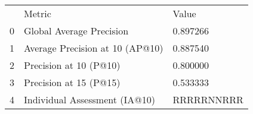 \begin{tabular}{lll}
 & Metric & Value \\
0 & Global Average Precision & 0.897266 \\
1 & Average Precision at 10 (AP@10) & 0.887540 \\
2 & Precision at 10 (P@10) & 0.800000 \\
3 & Precision at 15 (P@15) & 0.533333 \\
4 & Individual Assessment (IA@10) & RRRRRNNRRR \\
\end{tabular}
